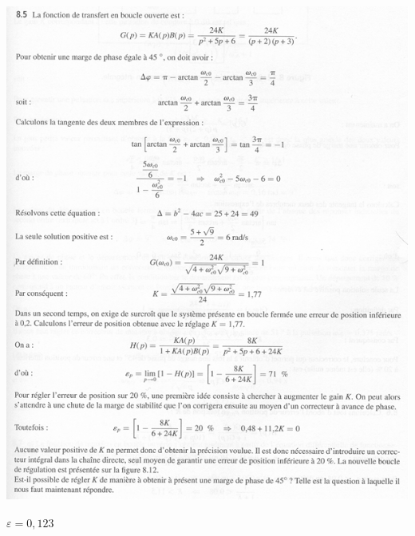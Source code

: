 \documentclass[10pt,fleqn]{article} %
\begin{document}
\newpage


\begin{center}
	\includegraphics[width=.8\linewidth]{images/cor_01}
	
	$\varepsilon = 0,123$
	

\end{center}
\end{document}
